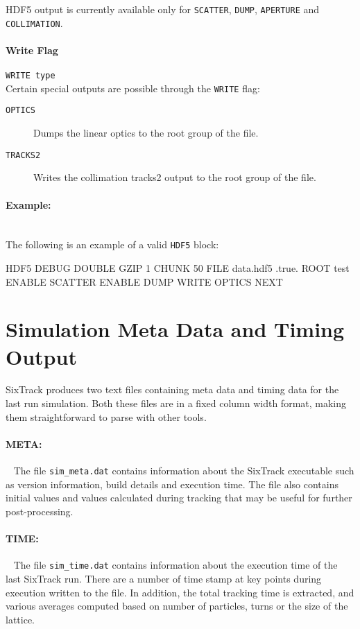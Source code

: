 HDF5 output is currently available only for \texttt{SCATTER}, \texttt{DUMP}, \texttt{APERTURE} and \texttt{COLLIMATION}.

\paragraph{Write Flag} \texttt{WRITE type}\\

Certain special outputs are possible through the \texttt{WRITE} flag:
\begin{description}
    \item[\texttt{OPTICS}] Dumps the linear optics to the root group of the file.
    \item[\texttt{TRACKS2}] Writes the collimation tracks2 output to the root group of the file.
\end{description}

\paragraph{Example:}~\\

The following is an example of a valid \texttt{HDF5} block:

\begin{cverbatim}
HDF5
    DEBUG
    DOUBLE
    GZIP 1
    CHUNK 50
    FILE data.hdf5 .true.
    ROOT test
    ENABLE SCATTER
    ENABLE DUMP
    WRITE OPTICS
NEXT
\end{cverbatim}

\section{Simulation Meta Data and Timing Output} \label{sec:METATIME}

SixTrack produces two text files containing meta data and timing data for the last run simulation.
Both these files are in a fixed column width format, making them straightforward to parse with other tools.

\paragraph{META:}~
The file \texttt{sim\_meta.dat} contains information about the SixTrack executable such as version information, build details and execution time.
The file also contains initial values and values calculated during tracking that may be useful for further post-processing.

\paragraph{TIME:}~
The file \texttt{sim\_time.dat} contains information about the execution time of the last SixTrack run.
There are a number of time stamp at key points during execution written to the file.
In addition, the total tracking time is extracted, and various averages computed based on number of particles, turns or the size of the lattice.
